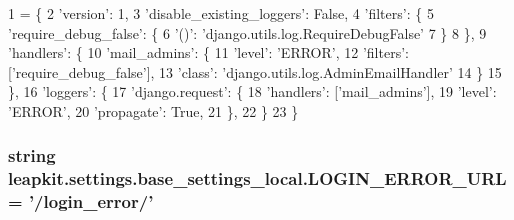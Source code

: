\begin{DoxyCode}
1 = \{
2     \textcolor{stringliteral}{'version'}: 1,
3     \textcolor{stringliteral}{'disable\_existing\_loggers'}: \textcolor{keyword}{False},
4     \textcolor{stringliteral}{'filters'}: \{
5         \textcolor{stringliteral}{'require\_debug\_false'}: \{
6             \textcolor{stringliteral}{'()'}: \textcolor{stringliteral}{'django.utils.log.RequireDebugFalse'}
7         \}
8     \},
9     \textcolor{stringliteral}{'handlers'}: \{
10         \textcolor{stringliteral}{'mail\_admins'}: \{
11             \textcolor{stringliteral}{'level'}: \textcolor{stringliteral}{'ERROR'},
12             \textcolor{stringliteral}{'filters'}: [\textcolor{stringliteral}{'require\_debug\_false'}],
13             \textcolor{stringliteral}{'class'}: \textcolor{stringliteral}{'django.utils.log.AdminEmailHandler'}
14         \}
15     \},
16     \textcolor{stringliteral}{'loggers'}: \{
17         \textcolor{stringliteral}{'django.request'}: \{
18             \textcolor{stringliteral}{'handlers'}: [\textcolor{stringliteral}{'mail\_admins'}],
19             \textcolor{stringliteral}{'level'}: \textcolor{stringliteral}{'ERROR'},
20             \textcolor{stringliteral}{'propagate'}: \textcolor{keyword}{True},
21         \},
22     \}
23 \}
\end{DoxyCode}
\hypertarget{namespaceleapkit_1_1settings_1_1base__settings__local_afca8abb60a287e145d0768d7ba83a36d}{
\subsubsection[{L\-O\-G\-I\-N\-\_\-\-E\-R\-R\-O\-R\-\_\-\-U\-R\-L}]{\setlength{\rightskip}{0pt plus 5cm}string leapkit.\-settings.\-base\-\_\-settings\-\_\-local.\-L\-O\-G\-I\-N\-\_\-\-E\-R\-R\-O\-R\-\_\-\-U\-R\-L = '/login\-\_\-error/'}}\label{namespaceleapkit_1_1settings_1_1base__settings__local_afca8abb60a287e145d0768d7ba83a36d}
